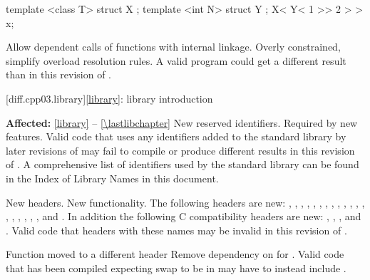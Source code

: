 \begin{codeblock}
template <class T> struct X { };
template <int N> struct Y { };
X< Y< 1 >> 2 > > x;
\end{codeblock}

\change
Allow dependent calls of functions with internal linkage.
\rationale
Overly constrained, simplify overload resolution rules.
\effect
A valid \CppIII{} program could get a different result than in this
revision of \Cpp{}.

[diff.cpp03.library]{\ref{library}: library introduction}

\pnum
\textbf{Affected:} \ref{library} -- \ref{\lastlibchapter}
\change
New reserved identifiers.
\rationale
Required by new features.
\effect
Valid \CppIII{} code that uses any identifiers added to the \Cpp{} standard
library by later revisions of \Cpp{} may fail to compile or produce different
results in this revision of \Cpp{}. A comprehensive list of identifiers used
by the \Cpp{} standard library can be found in the Index of Library Names in this
document.

\change
New headers.
\rationale
New functionality.
\effect
The following \Cpp{} headers are new:
,
,
,
,
,
,
,
,
,
,
,
,
,
,
,
,
,
,
,
and
.
In addition the following C compatibility headers are new:
,
,
,
and
.
Valid \CppIII{} code that  headers with these names may be
invalid in this revision of \Cpp{}.

\effect
Function  moved to a different header
\rationale
Remove dependency on  for .
\effect
Valid \CppIII{} code that has been compiled expecting swap to be in
 may have to instead include .

